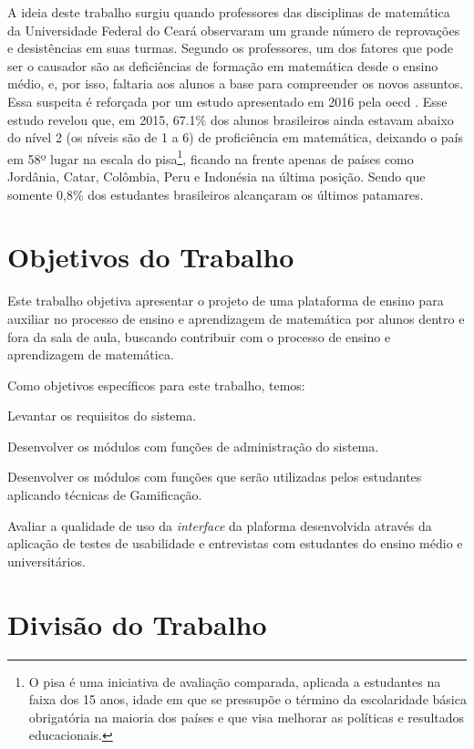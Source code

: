 A ideia deste trabalho surgiu quando professores das disciplinas de matemática da Universidade Federal do Cear\'a observaram um grande número de 
reprovações e desistências em suas turmas. Segundo os professores, um dos fatores que pode ser o causador são as deficiências de formação em matemática desde o ensino médio, e, por isso, faltaria aos alunos a base para compreender os novos assuntos. Essa suspeita é reforçada por um estudo apresentado em 2016 pela \gls{oecd} \cite{pisainfocus2016}. Esse estudo revelou que, em 2015, 67.1\% dos alunos brasileiros ainda estavam abaixo do nível 2 (os níveis são de 1 a 6) de proficiência em matem\'atica, deixando o país em 58º lugar na escala do \gls{pisa}\footnote{O \gls{pisa} é uma iniciativa de avaliação comparada, aplicada a estudantes na faixa dos 15 
anos, idade em que se pressupõe o término da escolaridade básica obrigatória na maioria dos países e que visa melhorar as políticas e 
resultados educacionais.}, ficando na frente apenas de países como Jordânia, Catar, Colômbia, Peru e Indonésia na \'ultima posi\c{c}\~ao. 
Sendo que somente 0,8\% dos estudantes brasileiros alcançaram os últimos patamares.

\section{Objetivos do Trabalho}

Este trabalho objetiva apresentar o projeto de uma plataforma de ensino para auxiliar no processo de ensino e aprendizagem de matemática por alunos dentro e 
fora da sala de aula, buscando contribuir com o processo de ensino e aprendizagem de matem\'atica. 

Como objetivos específicos para este trabalho, temos: 
\begin{alineas}
  \item Levantar os requisitos do sistema.
  \item Desenvolver os módulos com funções de administração do sistema.
  \item Desenvolver os módulos com funções que serão utilizadas pelos estudantes aplicando técnicas de Gamificação.
  \item Avaliar a qualidade de uso da \textit{interface} da plaforma desenvolvida através da aplicação de testes de usabilidade e entrevistas com estudantes do ensino m\'edio e universit\'arios.
\end{alineas}


\section{Divisão do Trabalho}

